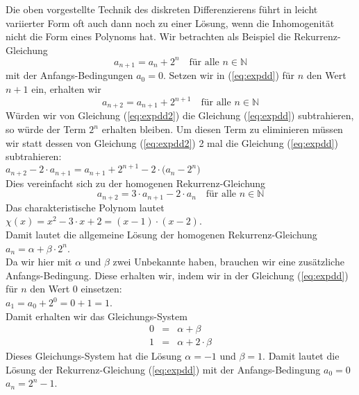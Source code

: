 \noindent
Die oben vorgestellte Technik des diskreten Differenzierens f\"{u}hrt in leicht variierter
Form oft auch dann noch zu einer L\"{o}sung, wenn die Inhomogenit\"{a}t nicht die Form eines
Polynoms hat.  Wir betrachten als Beispiel die Rekurrenz-Gleichung 
\begin{equation}
  \label{eq:expdd}
  a_{n+1} = a_n + 2^n \quad \mbox{f\"{u}r alle $n \in \mathbb{N}$}
\end{equation}
mit der Anfangs-Bedingungen $a_0 = 0$.   Setzen wir in (\ref{eq:expdd}) f\"{u}r $n$ den Wert $n+1$
ein, erhalten wir 
\begin{equation}
  \label{eq:expdd2}
  a_{n+2} = a_{n+1} + 2^{n+1} \quad \mbox{f\"{u}r alle $n \in \mathbb{N}$}
\end{equation}
W\"{u}rden wir von Gleichung (\ref{eq:expdd2}) die Gleichung (\ref{eq:expdd}) subtrahieren, so w\"{u}rde
der Term $2^n$ erhalten bleiben.  Um diesen Term zu eliminieren m\"{u}ssen wir statt dessen
von Gleichung (\ref{eq:expdd2}) 2 mal die Gleichung (\ref{eq:expdd})  subtrahieren: \\[0.2cm]
\hspace*{1.3cm}  
$a_{n+2} - 2 \cdot a_{n+1} = a_{n+1} + 2^{n+1} - 2 \cdot \bigl(a_n - 2^n\bigr)$ 
                 \\[0.2cm]
Dies vereinfacht sich zu der homogenen Rekurrenz-Gleichung 
\begin{equation}
  \label{eq:expdd3}
  a_{n+2} = 3 \cdot a_{n+1} - 2 \cdot a_n \quad \mbox{f\"{u}r alle $n \in \mathbb{N}$}  
\end{equation}
Das charakteristische Polynom lautet \\[0.2cm]
\hspace*{1.3cm} 
$\chi(x) = x^2 - 3 \cdot x + 2 = (x-1) \cdot (x-2)$.  \\[0.2cm]
Damit lautet die allgemeine L\"{o}sung der homogenen Rekurrenz-Gleichung \\[0.2cm]
\hspace*{1.3cm} 
$a_n = \alpha + \beta \cdot 2^n$.  \\[0.2cm]
Da wir hier mit $\alpha$ und $\beta$ zwei Unbekannte haben, brauchen wir eine zus\"{a}tzliche
Anfangs-Bedingung.  Diese erhalten wir, indem wir in der Gleichung (\ref{eq:expdd}) f\"{u}r $n$
den Wert $0$ einsetzen: \\[0.2cm]
\hspace*{1.3cm} $a_1 = a_0 + 2^0 = 0 + 1 = 1$. \\[0.2cm]
Damit erhalten wir das Gleichungs-System 
\[ 
\begin{array}{lcl}
0 &=& \alpha  + \beta  \\
1 &=& \alpha  + 2 \cdot \beta
\end{array} 
\]
Dieses Gleichungs-System hat die L\"{o}sung $\alpha = -1$ und $\beta = 1$.
Damit lautet die L\"{o}sung der Rekurrenz-Gleichung (\ref{eq:expdd}) mit der Anfangs-Bedingung
$a_0 = 0$ \\[0.2cm]
\hspace*{1.3cm} $a_n = 2^n - 1$.


